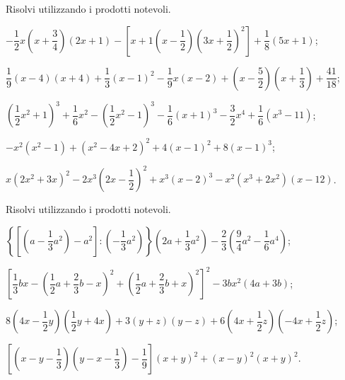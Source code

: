 \begin{esercizio}[\Ast]
 \label{ese:12.37}
Risolvi utilizzando i prodotti notevoli.
 \begin{enumeratea}
 \item $-{\dfrac{1}{2}x}\left(x+\dfrac{3}{4}\right)(2x+1)-\left[x+1\left(x-\dfrac{1}{2}\right)\left(3x+\dfrac{1}{2}\right)^{2}\right]+\dfrac{1}{8}(5x+1)$;
 \item $\dfrac{1}{9}(x-4)(x+4)+\dfrac{1}{3}(x-1)^{2}-\dfrac{1}{9}x(x-2)+\left(x-\dfrac{5}{2}\right)\left(x+\dfrac{1}{3}\right)+\dfrac{41}{18}$;
 \item $\left(\dfrac{1}{2}x^{2}+1\right)^{3}+\dfrac{1}{6}x^{2}-\left(\dfrac{1}{2}x^{2}-1\right)^{3}-\dfrac{1}{6}(x+1)^{3}-\dfrac{3}{2}x^{4}+\dfrac{1}{6}\left(x^3-11\right)$;
 \item $-x^{2}\left(x^{2}-1\right)+\left(x^{2}-4x+2\right)^{2}+4(x-1)^{2}+8(x-1)^{3}$;
 \item $x\left(2x^{2}+3x\right)^{2}-2x^{3}\left(2x-\dfrac{1}{2}\right)^{2}+x^{3}(x-2)^{3}-x^{2}\left(x^{3}+2x^{2}\right)(x-12)$.
 \end{enumeratea}
\end{esercizio}
\begin{esercizio}[\Ast]
 \label{ese:12.38}
Risolvi utilizzando i prodotti notevoli.
 \begin{enumeratea}
 \item $\left\lbrace\left[\left(a-\dfrac{1}{3}a^{2}\right)-a^{2}\right]:\left(-\dfrac{1}{3}a^{2}\right)\right\rbrace\left(2a+\dfrac{1}{3}a^{2}\right)-\dfrac{2}{3}\left(\dfrac{9}{4}a^{2}-\dfrac{1}{6}a^{4}\right)$;
 \item $\left[\dfrac{1}{3}bx-\left(\dfrac{1}{2}a+\dfrac{2}{3}b-x\right)^{2}+\left(\dfrac{1}{2}a+\dfrac{2}{3}b+x\right)^{2}\right]^{2}-3bx^{2}(4a+3b)$;
 \item $8\left(4x-\dfrac{1}{2}y\right)\left(\dfrac{1}{2}y+4x\right)+3(y+z)(y-z)+6\left(4x+\dfrac{1}{2}z\right)\left(-4x+\dfrac{1}{2}z\right)$;
 \item $\left[\left(x-y-\dfrac{1}{3}\right)\left(y-x-\dfrac{1}{3}\right)-\dfrac{1}{9}\right](x+y)^{2}+(x-y)^{2}(x+y)^{2}$.
 \end{enumeratea}
\end{esercizio}

